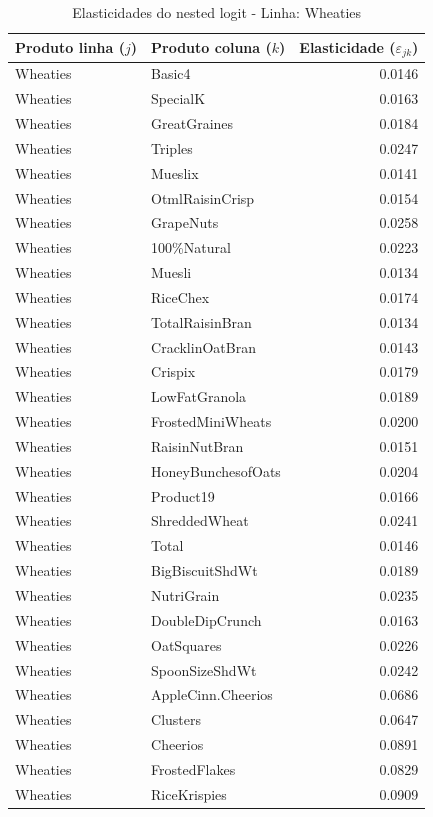 \begingroup
\begin{table}[H]
\centering
\caption{Elasticidades do nested logit - Linha: Wheaties}
\label{tab:elas-nested-wheaties}
\small
\begin{tabular}{llr}
\toprule
Produto linha ($j$) & Produto coluna ($k$) & Elasticidade ($\varepsilon_{jk}$) \\
\midrule
Wheaties & Basic4 & 0.0146 \\
Wheaties & SpecialK & 0.0163 \\
Wheaties & GreatGraines & 0.0184 \\
Wheaties & Triples & 0.0247 \\
Wheaties & Mueslix & 0.0141 \\
Wheaties & OtmlRaisinCrisp & 0.0154 \\
Wheaties & GrapeNuts & 0.0258 \\
Wheaties & 100\%Natural & 0.0223 \\
Wheaties & Muesli & 0.0134 \\
Wheaties & RiceChex & 0.0174 \\
Wheaties & TotalRaisinBran & 0.0134 \\
Wheaties & CracklinOatBran & 0.0143 \\
Wheaties & Crispix & 0.0179 \\
Wheaties & LowFatGranola & 0.0189 \\
Wheaties & FrostedMiniWheats & 0.0200 \\
Wheaties & RaisinNutBran & 0.0151 \\
Wheaties & HoneyBunchesofOats & 0.0204 \\
Wheaties & Product19 & 0.0166 \\
Wheaties & ShreddedWheat & 0.0241 \\
Wheaties & Total & 0.0146 \\
Wheaties & BigBiscuitShdWt & 0.0189 \\
Wheaties & NutriGrain & 0.0235 \\
Wheaties & DoubleDipCrunch & 0.0163 \\
Wheaties & OatSquares & 0.0226 \\
Wheaties & SpoonSizeShdWt & 0.0242 \\
Wheaties & AppleCinn.Cheerios & 0.0686 \\
Wheaties & Clusters & 0.0647 \\
Wheaties & Cheerios & 0.0891 \\
Wheaties & FrostedFlakes & 0.0829 \\
Wheaties & RiceKrispies & 0.0909 \\

\end{tabular}
\end{table}
